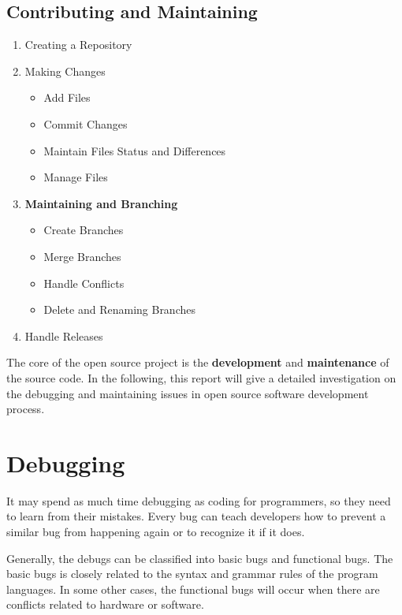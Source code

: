 \documentclass[draftclsnofoot,journal,onecolumn,12pt]{IEEEtran}
\begin{document}
\subsection{Contributing and Maintaining}

\begin{enumerate}
  \item Creating a Repository
  \item Making Changes
  \begin{itemize}
    \item Add Files
    \item Commit Changes
    \item Maintain Files Status and Differences
    \item Manage Files
  \end{itemize}
  \item \textbf{Maintaining and Branching}
  \begin{itemize}
    \item Create Branches
    \item Merge Branches
    \item Handle Conflicts
    \item Delete and Renaming Branches
\end{itemize}
  \item Handle Releases
\end{enumerate}

The core of the open source project is the \textbf{development} and \textbf{maintenance} of the source code. In the following, this report will give a detailed investigation on the debugging and maintaining issues in open source software development process.

\section{Debugging}


It may spend as much time debugging as coding for programmers, so they need to learn from their mistakes. Every bug can teach developers how to prevent a similar bug from happening again or to recognize it if it does.

Generally, the debugs can be classified into basic bugs and functional bugs. The basic bugs is closely related to the syntax and grammar rules of the program languages. In some other cases, the functional bugs will occur when there are conflicts related to hardware or software.
\end{document}

